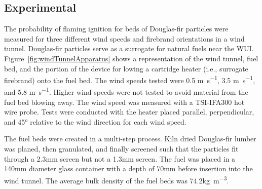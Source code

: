     \subsection{Experimental}
    The probability of flaming ignition for beds of Douglas-fir particles were measured for three different wind speeds and firebrand orientations in a wind tunnel. Douglas-fir particles serve as a surrogate for natural fuels near the WUI. Figure~\ref{fig:windTunnelApparatus} shows a representation of the wind tunnel, fuel bed, and the portion of the device for lowing a cartridge heater (i.e., surrogate firebrand) onto the fuel bed.  The wind speeds tested were 0.5 \si{\meter\per\second}, 3.5 \si{\meter\per\second}, and 5.8 \si{\meter\per\second}. Higher wind speeds were not tested to avoid material from the fuel bed blowing away. The wind speed was measured with a TSI-IFA300 hot wire probe. Tests were conducted with the heater placed parallel, perpendicular, and 45\si{\degree} relative to the wind direction for each wind speed. 

    
    The fuel beds were created in a multi-step process. Kiln dried Douglas-fir lumber was planed, then granulated, and finally screened such that the particles fit through a 2.3\si{\milli\meter} screen but not a 1.3\si{\milli\meter} screen. The fuel was placed in a 140\si{\milli\meter} diameter glass container with a depth of 70\si{\milli\meter} before insertion into the wind tunnel. The average bulk density of the fuel beds was 74.2\si{\kilo\gram\per\cubic\meter}.   
    
